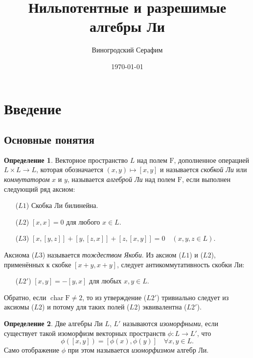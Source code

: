 \documentclass[a4paper, 12pt]{article}
\title{Нильпотентные и разрешимые алгебры Ли}
\author{Виногродский Серафим}
\date{\today}
\theoremstyle{definition}
\newtheorem{definition}{Определение}[section]
\begin{document}
\maketitle
\tableofcontents
\thispagestyle{empty}
\pagebreak

\section{Введение}%
\label{sec:introduction}

\subsection{Основные понятия}%
\label{sub:lie_algebra_notion}

\begin{definition}
    \label{def:lie_algebra}
    Векторное пространство \( L \) над полем \( \mathrm F \), дополненное операцией \( L \times L \to L \), которая обозначается \( (x ,y) \mapsto [x, y] \) и называется \textit{скобкой Ли} или \textit{коммутатором} \( x \) и \( y \), называется \textit{алгеброй Ли} над полем \( \mathrm F \), если выполнен следующий ряд аксиом:
\begin{itemize}
    \item[(\( L 1 \))] Скобка Ли билинейна.
    \item[(\( L 2 \))] \( [x, x] = 0 \) для любого \( x \in L \).
    \item[(\( L 3 \))] \( [x, [y, z]] + [y, [z, x]] + [z, [x, y]] = 0 \quad (x, y, z \in L) \).
\end{itemize}
\end{definition}

Аксиома (\( L 3 \)) называется \textit{тождеством Якоби}.
Из аксиом (\( L 1 \)) и (\( L 2 \)), применённых к скобке \( [x + y, x + y] \), следует антикоммутативность скобки Ли:
\begin{itemize}
    \item[(\( L 2' \))] \( [x, y] = -[y, x] \) для любых \( x, y \in L \).
\end{itemize}
Обратно, если \( \operatorname{char} \mathrm F \neq 2 \), то из утверждение (\( L 2' \)) тривиально следует из аксиомы (\( L 2 \)) и потому для таких полей (\( L 2 \)) эквивалентна (\( L 2' \)).

\begin{definition}
    \label{def:isomorphous_algebras}
    Две алгебры Ли \( L \), \( L' \) называются \textit{изоморфными}, если существует такой изоморфизм векторных пространств \( \phi : L \to L' \), что
    \[
        \phi([x, y]) = [\phi(x), \phi(y)] \quad \forall x, y \in L.
    \]
    Само отображение \( \phi \) при этом называется \textit{изоморфизмом} алгебр Ли.
\end{definition}
\end{document}
